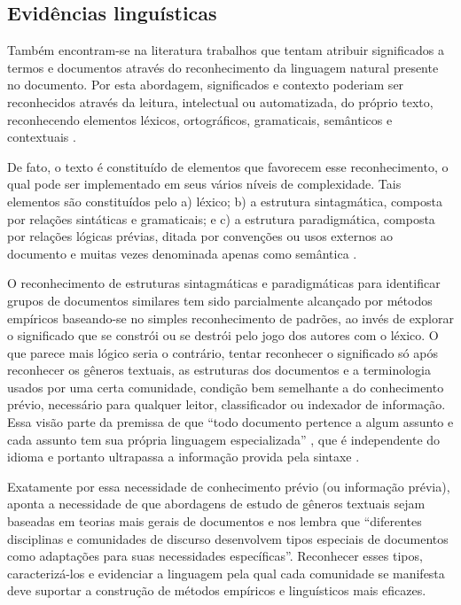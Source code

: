 \subsection{Evidências linguísticas}%

Também encontram-se na literatura trabalhos que tentam atribuir significados a termos e documentos através do reconhecimento da linguagem natural presente no documento. Por esta abordagem, significados e contexto poderiam ser reconhecidos através da leitura, intelectual ou automatizada, do próprio texto, reconhecendo elementos léxicos, ortográficos, gramaticais, semânticos e contextuais \cite{ladeira10}.

De fato, o texto é constituído de elementos que favorecem esse reconhecimento, o qual pode ser implementado em seus vários níveis de complexidade. Tais elementos são constituídos pelo a) léxico; b) a estrutura sintagmática, composta por relações sintáticas e gramaticais; e c) a estrutura paradigmática, composta por relações lógicas prévias, ditada por convenções ou usos externos ao documento e muitas vezes denominada apenas como semântica \cite[p. 147]{gardin1973}.

O reconhecimento de estruturas sintagmáticas e paradigmáticas para identificar grupos de documentos similares tem sido parcialmente alcançado por métodos empíricos baseando-se no simples reconhecimento de padrões, ao invés de explorar o significado que se constrói ou se destrói pelo jogo dos autores com o léxico. O que parece mais lógico seria o contrário, tentar reconhecer o significado só após reconhecer os gêneros textuais, as estruturas dos documentos e a terminologia usados por uma certa comunidade, condição bem semelhante a do conhecimento prévio, necessário para qualquer leitor, classificador ou indexador de informação. Essa visão parte da premissa de que ``todo documento pertence a algum assunto e cada assunto tem sua própria linguagem especializada'' \cite[p. 48]{ladeira10}, que é independente do idioma e portanto ultrapassa a informação provida pela sintaxe \cite{joyce11}.

Exatamente por essa necessidade de conhecimento prévio (ou informação prévia),  aponta a necessidade de que abordagens de estudo de gêneros textuais sejam baseadas em teorias mais gerais de documentos e nos lembra que ``diferentes disciplinas e comunidades de discurso desenvolvem tipos especiais de documentos como adaptações para suas necessidades específicas''. Reconhecer esses tipos, caracterizá-los e evidenciar a linguagem pela qual cada comunidade se manifesta deve suportar a construção de métodos empíricos e linguísticos mais eficazes.

